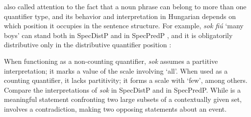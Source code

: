 \documentclass[output=paper]{langscibook}
\begin{document}
\citet{szabolcsi1994notequal, szabolcsi1995modes, szabolcsi2010quant} also called attention to the fact that a noun phrase can belong to more than one quantifier type, and its behavior and interpretation in Hungarian depends on which position it occupies in the sentence structure. For example, \textit{sok fiú} `many boys' can stand both in SpecDistP  and in SpecPredP , and it is obligatorily distributive only in the distributive quantifier position :

\eal
{}
\zl

\noindent When functioning as a non-counting quantifier, \textit{sok} assumes a partitive interpretation; it marks a value of the scale involving `all'. When used as a counting quantifier, it lacks partitivity; it forms a scale with `few', among others. Compare the interpretations of \textit{sok} in SpecDistP and in SpecPredP. While  is a meaningful statement confronting two large subsets of a contextually given set,  involves a contradiction, making two opposing statements about an event. 

\eal
{}
\zl
\end{document}
